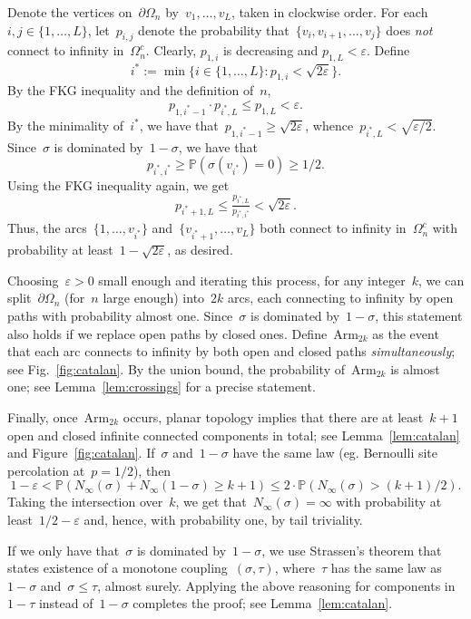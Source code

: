 \documentclass[11pt,letterpaper]{amsart}
\newcounter{n}
\numberwithin{n}{section}
\theoremstyle{plain}
\theoremstyle{definition}
\theoremstyle{remark}
\renewcommand\P{\mathbb P}
\newcommand\domain\Omega
\newcommand{\1}{\mathbbm{1}}
\begin{document}
Denote the vertices on~$\partial\domain_n$ by~$v_1, \dots, v_L$, taken in clockwise order.
For each~$i,j\in \{1,\dots,L\}$, let~$p_{i,j}$ denote the probability that~$\{v_i,v_{i+1},\dots,v_j\}$ does {\em not} connect to infinity in~$\domain_n^c$.
Clearly, $p_{1,i}$ is decreasing and $p_{1,L} < \varepsilon$.
Define
\[
	i^*:= \min \{i\in \{1,\dots,L\} \colon p_{1,i} < \sqrt{2\varepsilon}\}.
\]
By the FKG inequality and the definition of~$n$, 
\[
	p_{1,i^*-1}\cdot p_{i^*,L} \leq p_{1,L} < \varepsilon.
\]
By the minimality of~$i^*$, we have that~$p_{1,i^*-1} \geq \sqrt{2 \varepsilon}$, whence~$p_{i^*,L}< \sqrt{\varepsilon/2}$.
Since~$\sigma$ is dominated by~$1-\sigma$, we have that
\[
	p_{i^*,i^*} \geq \P(\sigma(v_{i^*}) = 0)  \geq 1/2.
\]
Using the FKG inequality again, we get
\[
	p_{i^*+1,L} \leq \tfrac{p_{i^*,L}}{p_{i^*,i^*}}< \sqrt{2\varepsilon}. 
\]
Thus, the arcs~$\{1,\dots,v_{i^*}\}$ and~$\{v_{i^*+1},\dots,v_L\}$ both connect to infinity in~$\domain_n^c$ with probability at least~$1-\sqrt{2\varepsilon}$, as desired.

Choosing~$\varepsilon>0$ small enough and iterating this process, for any integer~$k$, we can split~$\partial\domain_n$ (for~$n$ large enough) into~$2k$ arcs, each connecting to infinity by open paths with probability almost one.
Since~$\sigma$ is dominated by~$1-\sigma$, this statement also holds if we replace open paths by closed ones.
Define~$\mathrm{Arm}_{2k}$ as the event that each arc connects to infinity by both open and closed paths {\em simultaneously}; see Fig.~\ref{fig:catalan}.
By the union bound, the probability of~$\mathrm{Arm}_{2k}$ is almost one; see Lemma~\ref{lem:crossings} for a precise statement.

Finally, once~$\mathrm{Arm}_{2k}$ occurs, planar topology implies that there are at least~$k+1$ open and closed infinite connected components in total; see Lemma~\ref{lem:catalan} and Figure~\ref{fig:catalan}.
If~$\sigma$ and~$1-\sigma$ have the same law (eg. Bernoulli site percolation at~$p = 1/2$), then
\[
	1 - \varepsilon < \P(N_\infty(\sigma) + N_\infty(1-\sigma) \geq k+1) \leq 2 \cdot \P (N_\infty(\sigma) > (k+1)/2).  
\]
Taking the intersection over~$k$, we get that~$N_\infty(\sigma) = \infty$ with probability at least~$1/2-\varepsilon$ and, hence, with probability one, by tail triviality.

If we only have that~$\sigma$ is dominated by~$1-\sigma$, we use Strassen's theorem that states existence of a monotone coupling~$(\sigma,\tau)$, where~$\tau$ has the same law as~$1-\sigma$ and~$\sigma \leq \tau$, almost surely.
Applying the above reasoning for components in~$1-\tau$ instead of~$1-\sigma$ completes the proof; see Lemma~\ref{lem:catalan}.
\end{document}
